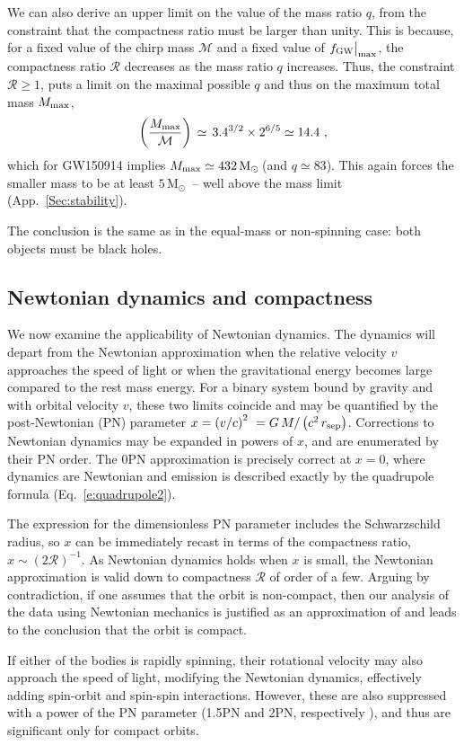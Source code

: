 \documentclass{andp2012}%
\def\({\left(}
\def\){\right)}
\def\be{\begin{equation}}
\def\ee{\end{equation}}
\newcommand{\refapp}[1]{App.\ \ref{#1}}
\newcommand{\refeqn}[1]{Eq.\ \ref{#1}}
\newcommand{\caveatformat}[1]{\subsection{#1}}
\def\Mc{\mathcal{M}}
\def\submax{\big|_{\rm max}}
\def\fgwmax{f_{\rm GW} \submax}
\newcommand{\Msun}{\ensuremath{\mathrm{M}_\odot\,}}
\begin{document}
We can also derive an upper limit on the value of the mass ratio $q$,
from the constraint that the compactness ratio must be larger than
unity. This is because, for a fixed value of the chirp mass $\Mc$ and a fixed
value of $\fgwmax$,
the compactness ratio $\mathcal{R}$ decreases
as the mass ratio $q$ increases.
Thus, the constraint $\mathcal{R} \geq 1$,
puts a limit on the maximal possible $q$
and thus on the maximum total mass $M_{\rm max}$,
\be \( \frac{ M_{\rm max} } { \Mc } \) \, \simeq \, 3.4^{3/2} \times 2^{6/5}
\simeq 14.4 ~,
\label{M limit}
\ee which for GW150914 implies $M_{\rm max} \simeq 432\, \Msun\!\!$
(and $q \simeq 83$).
This again forces the smaller mass to be at least $5\, \Msun\!\!$
--
well above the \NS mass limit (\refapp{Sec:stability}).

The conclusion is the same as in the equal-mass or non-spinning case:
both objects must be black holes.

\caveatformat{Newtonian dynamics and compactness}
\label{Sec:just:newton}
We now examine the applicability of Newtonian dynamics.
The dynamics will depart from the Newtonian approximation
when the relative velocity $v$ approaches the speed of light
or when the gravitational energy becomes large
compared to the rest mass energy.
For a binary system
bound by gravity
and with orbital velocity $v$,
these two limits coincide
and may be quantified
by the post-Newtonian (PN) parameter \cite{lrr-2014-2}
$x = \left( v/c \right)^2\ = G\,M / \( c^2 \, r_{\rm sep}\)$.
Corrections to Newtonian dynamics may be
expanded in powers of $x$,
and are enumerated by their PN order.
The 0PN approximation is
precisely correct at $x=0$,
where dynamics are Newtonian and \GW emission
is described exactly by the quadrupole formula (\refeqn{e:quadrupole2}).

The expression for the dimensionless PN parameter
includes the Schwarzschild radius, so
$x$ can be immediately recast
in terms of the compactness ratio,
$x \sim \(2\mathcal{R}\)^{-1}$.
As Newtonian dynamics holds when $x$ is small, the Newtonian
approximation is valid down to compactness $\mathcal{R}$ of order of a few.
Arguing by contradiction,
if one assumes that the orbit is non-compact,
then our analysis of the data
using Newtonian mechanics
is justified as an approximation of \GR
and leads to the conclusion that the orbit is compact.

If either of the bodies is rapidly spinning,
their rotational velocity may also approach the speed of light,
modifying the Newtonian dynamics,
effectively adding
spin-orbit and spin-spin interactions.
However, these are also suppressed
with a power of the PN parameter
(1.5PN and 2PN, respectively \cite{lrr-2014-2,SpinEFT,SpinEFT2}),
and thus are significant only for compact orbits.
\end{document}
